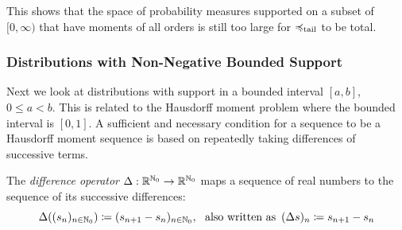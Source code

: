 \documentclass[a4paper]{scrreprt}
\begin{document}
    This shows that the space of probability measures supported on a subset of $[0, \infty)$ that have moments of all orders is still too large for $\preccurlyeq_{\text{tail}}$ to be total.
    
    \subsubsection{Distributions with Non-Negative Bounded Support}
    Next we look at distributions with support in a bounded interval $[a, b]$, $0 \leq a < b$.
    This is related to the Hausdorff moment problem where the bounded interval is $[0, 1]$.
    A sufficient and necessary condition for a sequence to be a Hausdorff moment sequence is based on repeatedly taking differences of successive terms.
    \begin{defn}
        The \emph{difference operator} $\Delta: \mathbb{R}^{\mathbb{N}_0} \to \mathbb{R}^{\mathbb{N}_0}$ maps a sequence of real numbers to the sequence of its successive differences:
        \[
            \Delta((s_n)_{n \in \mathbb{N}_0}) \coloneqq (s_{n+1} - s_n)_{n \in \mathbb{N}_0}, ~ \text{ also written as }\,
            (\Delta s)_n \coloneqq s_{n+1} - s_n
        \]
    \end{defn}
\end{document}
